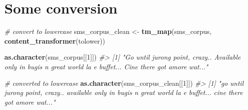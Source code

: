 \documentclass[]{book}
\newenvironment{Shaded}{\begin{snugshade}}{\end{snugshade}}
\newcommand{\CommentTok}[1]{\textcolor[rgb]{0.56,0.35,0.01}{\textit{#1}}}
\newcommand{\DecValTok}[1]{\textcolor[rgb]{0.00,0.00,0.81}{#1}}
\newcommand{\KeywordTok}[1]{\textcolor[rgb]{0.13,0.29,0.53}{\textbf{#1}}}
\newcommand{\NormalTok}[1]{#1}
\newcommand{\OperatorTok}[1]{\textcolor[rgb]{0.81,0.36,0.00}{\textbf{#1}}}
\newcommand{\StringTok}[1]{\textcolor[rgb]{0.31,0.60,0.02}{#1}}
\begin{document}
\begin{Shaded}
\end{Shaded}

\hypertarget{some-conversion}{%
\section{Some conversion}\label{some-conversion}}

\begin{Shaded}
\begin{Highlighting}[]
\CommentTok{# convert to lowercase}
\NormalTok{sms_corpus_clean <-}\StringTok{ }\KeywordTok{tm_map}\NormalTok{(sms_corpus, }\KeywordTok{content_transformer}\NormalTok{(tolower))}
\end{Highlighting}
\end{Shaded}

\begin{Shaded}
\begin{Highlighting}[]
\KeywordTok{as.character}\NormalTok{(sms_corpus[[}\DecValTok{1}\NormalTok{]])}
\CommentTok{#> [1] "Go until jurong point, crazy.. Available only in bugis n great world la e buffet... Cine there got amore wat..."}
\end{Highlighting}
\end{Shaded}

\begin{Shaded}
\begin{Highlighting}[]
\CommentTok{# converted to lowercase}
\KeywordTok{as.character}\NormalTok{(sms_corpus_clean[[}\DecValTok{1}\NormalTok{]])}
\CommentTok{#> [1] "go until jurong point, crazy.. available only in bugis n great world la e buffet... cine there got amore wat..."}
\end{Highlighting}
\end{Shaded}
\end{document}
